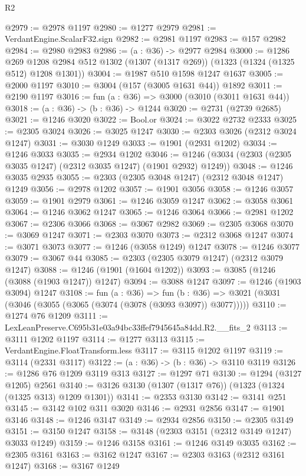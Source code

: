 \begin{lexlean}{R2}
\begin{coremodule}
@2979 := @2978 @1197
@2980 := @1277 @2979
@2981 := VerdantEngine.ScalarF32.sign
@2982 := @2981 @1197
@2983 := @157 @2982
@2984 := @2980 @2983
@2986 := (a : @36) -> @2977 @2984
@3000 := @1286
    @269
    @1208
    @2984
    @512
    @1302
    (@1307 (@1317 @269))
    (@1323 (@1324 (@1325 @512) @1208 @1301))
@3004 := @1987 @510 @1598 @1247 @1637
@3005 := @2000 @1197
@3010 := @3004 (@157 (@3005 @1631 @44)) @1892
@3011 := @2190 @1197
@3016 := fun (a : @36) => @3000 (@3010 (@3011 @1631 @44))
@3018 := (a : @36) -> (b : @36) -> @1244
@3020 := @2731 (@2739 @2685)
@3021 := @1246 @3020
@3022 := Bool.or
@3024 := @3022 @2732 @2333
@3025 := @2305 @3024
@3026 := @3025 @1247
@3030 := @2303 @3026 (@2312 @3024 @1247)
@3031 := @3030 @1249
@3033 := @1901 (@2931 @1202)
@3034 := @1246 @3033
@3035 := @2934 @1202
@3046 := @1246 (@3034 (@2303 (@2305 @3035 @1247) (@2312 @3035 @1247) (@1901 @2932) @1249))
@3048 := @1246 @3035 @2935
@3055 := @2303 (@2305 @3048 @1247) (@2312 @3048 @1247) @1249
@3056 := @2978 @1202
@3057 := @1901 @3056
@3058 := @1246 @3057
@3059 := @1901 @2979
@3061 := @1246 @3059 @1247
@3062 := @3058 @3061
@3064 := @1246 @3062 @1247
@3065 := @1246 @3064
@3066 := @2981 @1202
@3067 := @2306 @3066
@3068 := @3067 @2982
@3069 := @2305 @3068
@3070 := @3069 @1247
@3071 := @2303 @3070
@3073 := @2312 @3068 @1247
@3074 := @3071 @3073
@3077 := @1246 (@3058 @1249) @1247
@3078 := @1246 @3077
@3079 := @3067 @44
@3085 := @2303 (@2305 @3079 @1247) (@2312 @3079 @1247)
@3088 := @1246 (@1901 (@1604 @1202))
@3093 := @3085 (@1246 (@3088 (@1903 @1247)) @1247)
@3094 := @3088 @1247
@3097 := @1246 (@1903 @3094) @1247
@3108 := fun (a : @36) =>
  fun (b : @36) => @3021 (@3031 (@3046 (@3055 (@3065 (@3074 (@3078 (@3093 @3097)) @3077)))))
@3110 := @1274 @76 @1209
@3111 := LexLeanPreserve.C695b31e03a94bc33ffef7945645a84dd.R2.__fits_2
@3113 := @3111 @1202 @1197
@3114 := @1277 @3113
@3115 := VerdantEngine.FloatTransform.less
@3117 := @3115 @1202 @1197
@3119 := @3114 (@2331 @3117)
@3122 := (a : @36) -> (b : @36) -> @3110 @3119
@3126 := @1286 @76 @1209 @3119 @313
@3127 := @1297 @71
@3130 := @1294 (@3127 @1205) @2561
@3140 := @3126 @3130 (@1307 (@1317 @76)) (@1323 (@1324 (@1325 @313) @1209 @1301))
@3141 := @2353 @3130
@3142 := @3141 @251
@3145 := @3142 @102 @311 @3020
@3146 := @2931 @2856
@3147 := @1901 @3146
@3148 := @1246 @3147
@3149 := @2934 @2856
@3150 := @2305 @3149
@3151 := @3150 @1247
@3158 := @3148 (@2303 @3151 (@2312 @3149 @1247) @3033 @1249)
@3159 := @1246 @3158
@3161 := @1246 @3149 @3035
@3162 := @2305 @3161
@3163 := @3162 @1247
@3167 := @2303 @3163 (@2312 @3161 @1247)
@3168 := @3167 @1249

\end{coremodule}
\end{lexlean}
